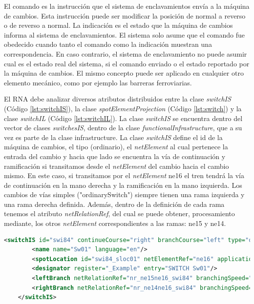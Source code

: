     El comando es la instrucción que el sistema de enclavamientos envía a la máquina de cambios. Esta instrucción puede ser modificar la posición de normal a reverso o de reverso a normal. La indicación es el estado que la máquina de cambios informa al sistema de enclavamientos. El sistema solo asume que el comando fue obedecido cuando tanto el comando como la indicación muestran una correspondencia. En caso contrario, el sistema de enclavamiento no puede asumir cual es el estado real del sistema, si el comando enviado o el estado reportado por la máquina de cambios. El mismo concepto puede ser aplicado en cualquier otro elemento mecánico, como por ejemplo las barreras ferroviarias.

    El RNA debe analizar diversos atributos distribuidos entre la clase \textit{switchIS} (Código \ref{lst:switchIS}), la clase \textit{spotElementProjection} (Código \ref{lst:switch}) y la clase \textit{switchIL} (Código \ref{lst:switchIL}). La clase \textit{switchIS} se encuentra dentro del vector de clases \textit{switchesIS}, dentro de la clase \textit{functionalInfrastructure}, que a su vez es parte de la clase infrastructure. La clase \textit{switchIS} define el id de la máquina de cambios, el tipo (ordinario), el \textit{netElement} al cual pertenece la entrada del cambio y hacia que lado se encuentra la vía de continuación y ramificación si transitamos desde el \textit{netElement} del cambio hacia el cambio mismo. En este caso, si transitamos por el \textit{netElement} ne16 el tren tendrá la vía de continuación en la mano derecha y la ramificación en la mano izquierda. Los cambios de vías simples ("ordinarySwitch") siempre tienen una rama izquierda y una rama derecha definida. Además, dentro de la definición de cada rama tenemos el atributo \textit{netRelationRef}, del cual se puede obtener, procesamiento mediante, los otros \textit{netElement} correspondientes a las ramas: ne15 y ne14.

    \begin{lstlisting}[language = XML, caption = Clase \textit{switchIS} , label = {lst:switchIS}]
    <switchIS id="swi84" continueCourse="right" branchCourse="left" type="ordinarySwitch">
        <name name="Sw01" language="en"/>
        <spotLocation id="swi84_sloc01" netElementRef="ne16" applicationDirection="reverse" intrinsicCoord="0.0000"/>
        <designator register="_Example" entry="SWITCH Sw01"/>
        <leftBranch netRelationRef="nr_ne15ne16_swi84" branchingSpeed="0" joiningSpeed="0" radius="-500"/>
        <rightBranch netRelationRef="nr_ne14ne16_swi84" branchingSpeed="0" joiningSpeed="0" radius="0"/>
    </switchIS>
    \end{lstlisting}

